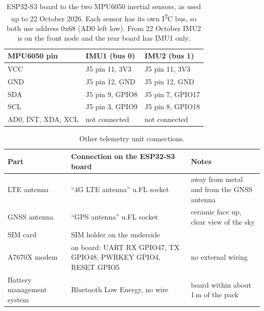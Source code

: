 \begin{table}[htbp]
\centering
\caption[ESP32-S3 board to the two MPU6050 inertial sensors, as used up to 22 October 2026]{ESP32-S3 board to the two MPU6050 inertial sensors, as used up to 22 October 2026. Each sensor has its own I\textsuperscript{2}C bus, so both use address 0x68 (AD0 left low). From 22 October IMU2 is on the front node and the rear board has IMU1 only.}
\label{tab:wiring-imu}
\begin{tabular}{|l|l|l|}
\hline
\textbf{MPU6050 pin} & \textbf{IMU1 (bus 0)} & \textbf{IMU2 (bus 1)} \\ \hline
VCC & J5 pin 11, 3V3 & J5 pin 11, 3V3 \\ \hline
GND & J5 pin 12, GND & J5 pin 12, GND \\ \hline
SDA & J5 pin 9, GPIO8 & J5 pin 7, GPIO17 \\ \hline
SCL & J5 pin 3, GPIO9 & J5 pin 8, GPIO18 \\ \hline
AD0, INT, XDA, XCL & not connected & not connected \\ \hline
\end{tabular}
\end{table}

\begin{table}[htbp]
\centering
\caption[Other telemetry unit connections]{Other telemetry unit connections.}
\label{tab:wiring-esp-other}
\begin{tabular}{|p{3.4cm}|p{4.6cm}|p{4.6cm}|}
\hline
\textbf{Part} & \textbf{Connection on the ESP32-S3 board} & \textbf{Notes} \\ \hline
LTE antenna & ``4G LTE antenna'' u.FL socket & away from metal and from the GNSS antenna \\ \hline
GNSS antenna & ``GPS antenna'' u.FL socket & ceramic face up, clear view of the sky \\ \hline
SIM card & SIM holder on the underside & \\ \hline
A7670X modem & on board: UART RX GPIO47, TX GPIO48, PWRKEY GPIO4, RESET GPIO5 & no external wiring \\ \hline
Battery management system & Bluetooth Low Energy, no wire & board within about 1\,m of the pack \\ \hline
\end{tabular}
\end{table}

